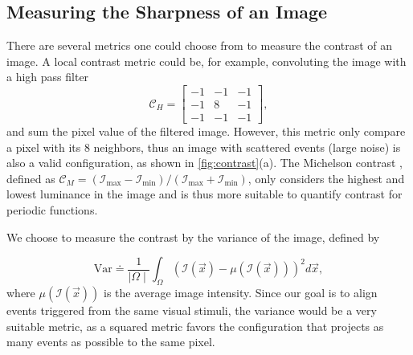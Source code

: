 \subsection{Measuring the Sharpness of an Image}
\label{sec:contrast}
There are several metrics one could choose from to measure the
contrast of an image. A local contrast metric could be, for example,
convoluting the image with a high pass filter
\begin{equation}
  \label{eq:high_pass_filter}
  \mathcal{C}_H=
  \begin{bmatrix}
    -1&-1&-1\\
    -1&8&-1\\
    -1&-1&-1
  \end{bmatrix},
\end{equation}
and sum the pixel value of the filtered image. However, this metric
only compare a pixel with its 8 neighbors, thus an image with
scattered events (large noise) is also a valid configuration, as shown
in \cref{fig:contrast}(a). The Michelson contrast
\citep{michelson1995studies}, defined as
$\mathcal{C}_M=\left(\mathcal{I}_{\mathrm{max}}-\mathcal{I}_{\mathrm{min}}\right)/\left(\mathcal{I}_{\mathrm{max}}+\mathcal{I}_{\mathrm{min}}\right)$,
only considers the highest and lowest luminance in the image and is
thus more suitable to quantify contrast for periodic functions.

We choose to measure the contrast by the variance of the image,
defined by

\begin{equation}
  \label{eq:variance}
  \mathrm{Var}\doteq\frac{1}{\mid\Omega\mid}\int_{\Omega}\left(\mathcal{I}\left(\vec{x}\right)-\mu\left(\mathcal{I}\left(\vec{x}\right)\right)\right)^2d\vec{x},
\end{equation}
where $\mu\left(\mathcal{I}\left(\vec{x}\right)\right)$ is the average
image intensity. Since our goal is to align events triggered from the
same visual stimuli, the variance would be a very suitable metric, as
a squared metric favors the configuration that projects as many events
as possible to the same pixel.

